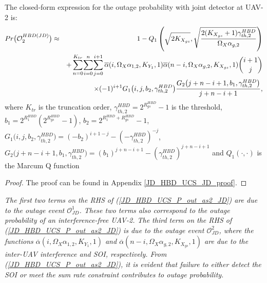 \begin{theorem}
The closed-form expression for the outage probability with joint detector at UAV-2 is:
\begin{eqnarray} \label{JD_HBD_UCS_P_out_as2_JD}
Pr\big(\mathcal{O}_{2}^{HBD(JD)}\big) & \approx & 1 - Q_1\left( \sqrt{2K_{X_{gs}}}, \sqrt{\frac{2(K_{X_{gs}}+1)\gamma_{th,2}^{HBD}}{\Omega_{X}\alpha_{g,2}}} \right) \nonumber\\
& & \hspace{0cm} + \sum_{n=0}^{K_{tr}} \hspace{-0.05cm} \sum_{i=0}^{n} \hspace{-0.05cm} \sum_{j=0}^{i+1} \overline{\alpha}(i,\Omega_X\alpha_{1,2},K_{Y_1},1) \overline{\alpha}(n-i,\Omega_X\alpha_{g,2},K_{X_{gs}},1) \binom{i+1}{j} \nonumber\\
& & \hspace{1cm} \times (-1)^{i+1} G_1\big(i,j,b_2,\gamma_{th,2}^{HBD}\big) \frac{G_2\big(j+n-i+1,b_1,\gamma_{th,2}^{HBD}\big)}{j+n-i+1},
\end{eqnarray}
where $K_{tr}$ is the truncation order, $\gamma_{th,2}^{HBD} = 2^{R_{gs}^{HBD}}-1$ is the threshold, $b_1 = 2^{R_{1}^{HBD}}(2^{R_{gs}^{HBD}}-1)$, $b_2 = 2^{R_{1}^{HBD}+R_{gs}^{HBD}}-1$, $G_1\big(i,j,b_2,\gamma_{th,2}^{HBD}\big)=(-b_2)^{i+1-j} - (-\gamma_{th,2}^{HBD})^{-j}$, $G_2\big(j+n-i+1,b_1,\gamma_{th,2}^{HBD}\big) = (b_1)^{j+n-i+1} - (\gamma_{th,2}^{HBD})^{j+n-i+1}$ and $Q_1\left(\cdot,\cdot\right)$ is the Marcum Q function \cite{andras2011generalized}
\end{theorem}
\begin{proof}
The proof can be found in Appendix \ref{JD_HBD_UCS_JD_proof}.
\end{proof}

\begin{remark}
\textit{The first two terms on the RHS of (\ref{JD_HBD_UCS_P_out_as2_JD}) are due to the outage event $\mathcal{O}_{JD}^{1}$. These two terms also correspond to the outage probability of an interference-free UAV-2. The third term on the RHS of (\ref{JD_HBD_UCS_P_out_as2_JD}) is due to the outage event $\mathcal{O}_{JD}^{2}$, where the functions $\overline{\alpha}(i,\Omega_X\alpha_{1,2},K_{Y_1},1)$ and $\overline{\alpha}(n-i,\Omega_X\alpha_{g,2},K_{X_{gs}},1)$ are due to the inter-UAV interference and SOI, respectively. From (\ref{JD_HBD_UCS_P_out_as2_JD}), it is evident that failure to either detect the SOI or meet the sum rate constraint contributes to outage probability.}
\end{remark}

